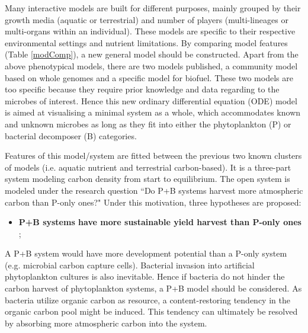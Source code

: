 \documentclass[../thesis.tex]{subfiles} %
\begin{document}
Many interactive models are built for different purposes, mainly grouped by their growth media (aquatic or terrestrial) and number of players (multi-lineages or multi-organs within an individual).  These models are specific to their respective environmental settings and nutrient limitations.  By comparing model features (Table \ref{modComp}), a new general model should be constructed.  Apart from the above phenotypical models, there are two models published, a community model based on whole genomes\autocite{harcombe2014metabolic} and a specific model for biofuel\autocite{kirthiga2014mathematical}.  These two models are too specific because they require prior knowledge and data regarding to the microbes of interest.  Hence this new ordinary differential equation (ODE) model is aimed at visualising a minimal system as a whole, which accommodates known and unknown microbes as long as they fit into either the phytoplankton (P) or bacterial decomposer (B) categories.

Features of this model/system are fitted between the previous two known clusters of models (i.e. aquatic nutrient and terrestrial carbon-based).  It is a three-part system modeling carbon density from start to equilibrium.  The open system is modeled under the research question ``Do P+B systems harvest more atmospheric carbon than P-only ones?"
Under this motivation, three hypotheses are proposed:
\begin{itemize}
    \item \textbf{
    P+B systems have more sustainable yield harvest than P-only ones
    };
\end{itemize}

A P+B system would have more development potential than a P-only system (e.g. microbial carbon capture cells).  Bacterial invasion into artificial phytoplankton cultures is also inevitable.  Hence if bacteria do not hinder the carbon harvest of phytoplankton systems, a P+B model should be considered.  As bacteria utilize organic carbon as resource, a content-restoring tendency in the organic carbon pool might be induced.  This tendency can ultimately be resolved by absorbing more atmospheric carbon into the system.
\end{document}

